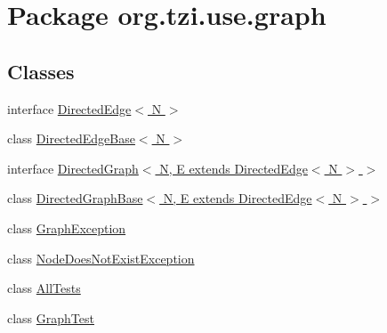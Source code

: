 \hypertarget{namespaceorg_1_1tzi_1_1use_1_1graph}{\section{Package org.\-tzi.\-use.\-graph}
\label{namespaceorg_1_1tzi_1_1use_1_1graph}
}
\subsection*{Classes}
\begin{DoxyCompactItemize}
\item 
interface \hyperlink{interfaceorg_1_1tzi_1_1use_1_1graph_1_1_directed_edge_3_01_n_01_4}{Directed\-Edge$<$ N $>$}
\item 
class \hyperlink{classorg_1_1tzi_1_1use_1_1graph_1_1_directed_edge_base_3_01_n_01_4}{Directed\-Edge\-Base$<$ N $>$}
\item 
interface \hyperlink{interfaceorg_1_1tzi_1_1use_1_1graph_1_1_directed_graph_3_01_n_00_01_e_01extends_01_directed_edge_3_01_n_01_4_01_4}{Directed\-Graph$<$ N, E extends Directed\-Edge$<$ N $>$ $>$}
\item 
class \hyperlink{classorg_1_1tzi_1_1use_1_1graph_1_1_directed_graph_base_3_01_n_00_01_e_01extends_01_directed_edge_3_01_n_01_4_01_4}{Directed\-Graph\-Base$<$ N, E extends Directed\-Edge$<$ N $>$ $>$}
\item 
class \hyperlink{classorg_1_1tzi_1_1use_1_1graph_1_1_graph_exception}{Graph\-Exception}
\item 
class \hyperlink{classorg_1_1tzi_1_1use_1_1graph_1_1_node_does_not_exist_exception}{Node\-Does\-Not\-Exist\-Exception}
\item 
class \hyperlink{classorg_1_1tzi_1_1use_1_1graph_1_1_all_tests}{All\-Tests}
\item 
class \hyperlink{classorg_1_1tzi_1_1use_1_1graph_1_1_graph_test}{Graph\-Test}
\end{DoxyCompactItemize}
